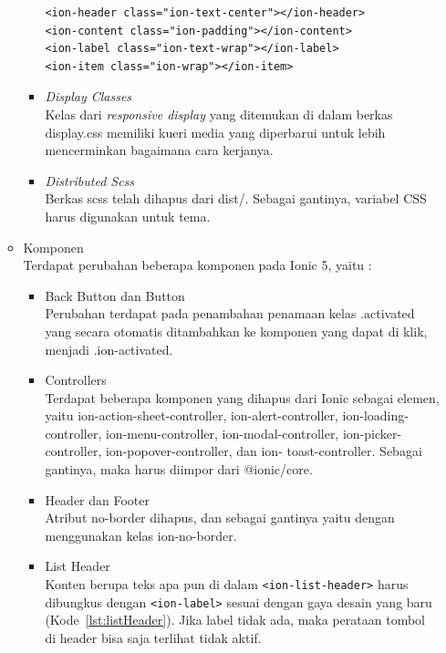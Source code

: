 \begin{enumerate}
\begin{itemize}
\begin{itemize}
\begin{lstlisting}[label={lst:CSSUtilities}, caption=Contoh Kode Kelas CSS {\it Utility} pada Ionic 5]
<ion-header class="ion-text-center"></ion-header>
<ion-content class="ion-padding"></ion-content>
<ion-label class="ion-text-wrap"></ion-label>
<ion-item class="ion-wrap"></ion-item>
\end{lstlisting} 
  
			\item {\it Display Classes} \\ 
			Kelas dari {\it responsive display} yang ditemukan di dalam berkas display.css memiliki kueri media yang diperbarui untuk lebih mencerminkan bagaimana cara kerjanya.

			\item {\it Distributed Scss} \\
			Berkas scss telah dihapus dari dist/. Sebagai gantinya, variabel CSS harus digunakan untuk tema.

		\end{itemize}

		\item Komponen\\
		Terdapat perubahan beberapa komponen pada Ionic 5, yaitu :
		\begin{itemize}
			\item Back Button dan Button  \\
			Perubahan terdapat pada penambahan penamaan kelas .activated yang secara otomatis ditambahkan ke komponen yang dapat di klik, menjadi .ion-activated.
			
			\item Controllers\\
			Terdapat beberapa komponen yang dihapus dari Ionic sebagai elemen, yaitu ion-action-sheet-controller, ion-alert-controller, ion-loading-controller, ion-menu-controller, ion-modal-controller, ion-picker-controller, ion-popover-controller, dan ion- toast-controller. Sebagai gantinya, maka harus diimpor dari @ionic/core. 
			\item Header dan Footer\\
			Atribut no-border dihapus, dan sebagai gantinya yaitu dengan menggunakan kelas ion-no-border.
			
			\item List Header\\
			Konten berupa teks apa pun di dalam \texttt{<ion-list-header>} harus dibungkus dengan \texttt{<ion-label>} sesuai dengan gaya desain yang baru (Kode~\ref{lst:listHeader}). Jika label tidak ada, maka perataan tombol di header bisa saja terlihat tidak aktif. 


\end{itemize}
\end{itemize}
\end{enumerate}
